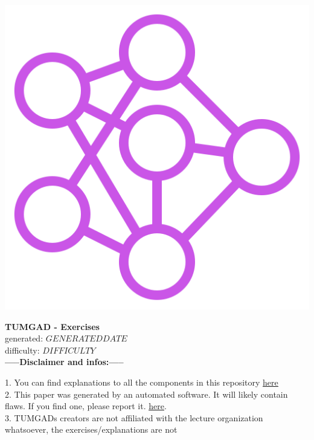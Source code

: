 \documentclass[12pt]{article}
\begin{document}
    \begin{center}
        \includegraphics[scale=0.25]{favicon.png} %
        \vspace{15px}

        {\selectfont
            \textbf{\LARGE{TUMGAD - Exercises}}\\
            generated: $GENERATEDDATE$
            \\
            difficulty: $DIFFICULTY$
            \\
        }
        \vspace{20px}
        \textbf{\LARGE{-----Disclaimer and infos:-----}}
        \\[0.2in]
    \end{center}
    1. You can find explanations to all the components in this repository \href{https://sebastianoner.github.io/TUMGAD/src/routes}{\underline{here}}
    \\[0.2in]
    2. This paper was generated by an automated software.
    It will likely contain flaws.
    If you find one, please report it.
    \href{https://github.com/SebastianOner/TUMGAD/issues/new?assignees=&labels=&template=bug_report.md&title=}{\underline{here}}.
    \\[0.2in]
    3. TUMGADs creators are not affiliated with the lecture organization whatsoever, the exercises/explanations are not
\end{document}
